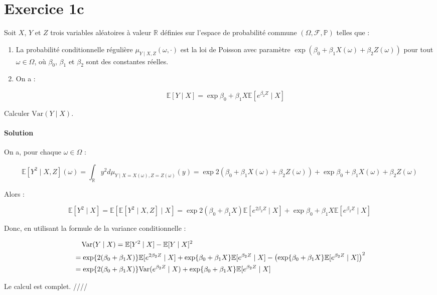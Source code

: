 \documentclass[../main.tex]{subfiles}
\begin{document}
\section{Exercice 1c}
\begin{CJK*}{UTF8}{gbsn}
Soit $X$, $Y$ et $Z$ trois variables aléatoires à valeur $\mathbb{R}$ définies sur
l'espace de probabilité commune $(\Omega, \mathcal{F}, \mathbb{P})$ telles que :

\begin{enumerate}
    \item La probabilité conditionnelle régulière $\mu_{Y \mid X, Z}(\omega, \cdot)$ est la loi de Poisson avec paramètre 
    $\exp(\beta_0 + \beta_1 X(\omega) + \beta_2 Z(\omega))$ pour tout $\omega \in \Omega$, 
    où $\beta_0$, $\beta_1$ et $\beta_2$ sont des constantes réelles.
    \item On a :
    
    \begin{equation*}
        \mathbb{E}[Y \mid X] = \exp{\beta_0+\beta_1 X} \mathbb{E}[e^{\beta_2 Z} \mid X]
    \end{equation*}
\end{enumerate}

Calculer $\text{Var}(Y \mid X)$.

\smallskip
\paragraph{Solution}
On a, pour chaque $\omega \in \Omega$ :

\begin{equation*}
    \mathbb{E}[Y^2 \mid X, Z](\omega) = \int_{\mathbb{R}} y^2 d \mu_{Y \mid X = X(\omega), Z = Z(\omega)} (y) = 
    \exp{2(\beta_0 + \beta_1X(\omega) + \beta_2Z(\omega))}  + \exp{\beta_0 + \beta_1X(\omega) + \beta_2Z(\omega)}
\end{equation*}

Alors :

\begin{equation*}
    \mathbb{E}[Y^2 \mid X] = \mathbb{E}[\mathbb{E}[Y^2 \mid X, Z] \mid X] = 
    \exp{2(\beta_0+\beta_1X)}\mathbb{E}[e^{2 \beta_2 Z} \mid X] + \exp{\beta_0 + \beta_1 X} \mathbb{E}[e^{\beta_2Z} \mid X]
\end{equation*}

Donc, en utilisant la formule de la variance conditionnelle :

\begin{equation*}
    \begin{split}
    &\tab[0.4cm] \text{Var}(Y \mid X) = \mathbb{E}[Y^2 \mid X] - \mathbb{E}[Y \mid X]^2 \\ & = 
    \exp{2(\beta_0+\beta_1X)}\mathbb{E}[e^{2 \beta_2 Z} \mid X] + \exp{\beta_0 + \beta_1 X} \mathbb{E}[e^{\beta_2Z} \mid X] 
    - \bracket{\exp{\beta_0+\beta_1 X} \mathbb{E}[e^{\beta_2 Z} \mid X]}^2 \\ & = 
    \exp{2(\beta_0+\beta_1X)} \text{Var}(e^{\beta_2 Z} \mid X) + \exp{\beta_0 + \beta_1 X} \mathbb{E}[e^{\beta_2Z} \mid X]
    \end{split}
\end{equation*}

Le calcul est complet. ////
\end{CJK*}
\end{document}
